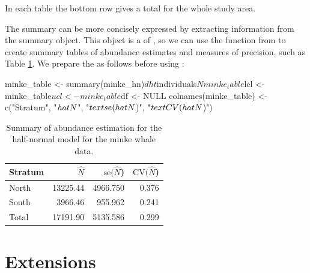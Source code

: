 \documentclass[article]{jss}
\begin{document}
In each table the bottom row gives a total for the whole study area.

The summary can be more concisely expressed by extracting information
from the summary object. This object is a  of
, so we can use the  function from
 to create summary tables of abundance estimates and measures
of precision, such as Table \ref{minke-abund}. We prepare the
 as follows before using :

\begin{CodeChunk}
\begin{CodeInput}
minke_table <- summary(minke_hn)$dht$individuals$N
minke_table$lcl <- minke_table$ucl <- minke_table$df <- NULL
colnames(minke_table) <- c("Stratum", "$\\hat{N}$", "$\\text{se}(\\hat{N}$)", 
                           "$\\text{CV}(\\hat{N}$)")
\end{CodeInput}
\end{CodeChunk}

\begin{CodeChunk}
\begin{table}

\centering
\begin{tabular}[t]{lrrr}
\toprule
Stratum & $\hat{N}$ & $\text{se}(\hat{N}$) & $\text{CV}(\hat{N}$)\\
\midrule
North & 13225.44 & 4966.750 & 0.376\\
South & 3966.46 & 955.962 & 0.241\\
Total & 17191.90 & 5135.586 & 0.299\\
\bottomrule
\end{tabular}
\caption{Summary of abundance estimation for the half-normal model for the minke whale data.\label{minke-abund}}
\end{table}

\end{CodeChunk}

\section{Extensions}\label{extensions}
\end{document}
